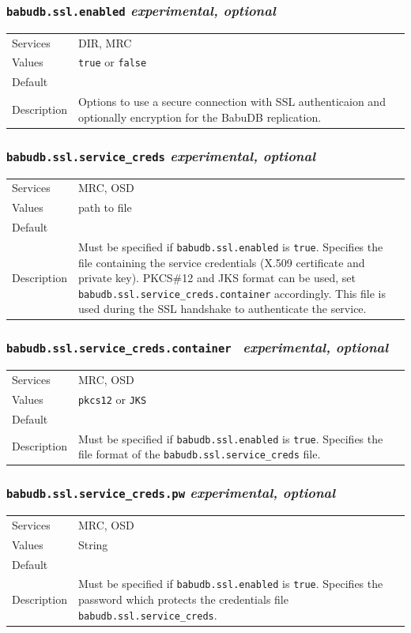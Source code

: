 \documentclass[a4paper,10pt]{book}
\begin{document}
\subsubsection{\texttt{babudb.ssl.enabled} \textit{experimental, optional}}
\begin{tabular}{lp{10cm}}
 Services & DIR, MRC\\
 Values   & \texttt{true} or \texttt{false}\\
 Default  & \\
 Description & Options to use a secure connection with SSL authenticaion and optionally encryption for the BabuDB replication. 
\end{tabular}

\subsubsection{\texttt{babudb.ssl.service\_creds} \textit{experimental, optional}}
\begin{tabular}{lp{10cm}}
 Services & MRC, OSD\\
 Values   & path to file\\
 Default  & \\
 Description & Must be specified if \texttt{babudb.ssl.enabled} is \texttt{true}. Specifies the file containing the service credentials (X.509 certificate and private key). PKCS\#12 and JKS format can be used, set \texttt{babudb.ssl.service\_creds.container} accordingly. This file is used during the SSL handshake to authenticate the service.
\end{tabular}

\subsubsection{\texttt{babudb.ssl.service\_creds.container } \textit{experimental, optional}}
\begin{tabular}{lp{10cm}}
 Services & MRC, OSD\\
 Values   & \texttt{pkcs12} or \texttt{JKS}\\
 Default  & \\
 Description & Must be specified if \texttt{babudb.ssl.enabled} is \texttt{true}. Specifies the file format of the \texttt{babudb.ssl.service\_creds} file.
\end{tabular}

\subsubsection{\texttt{babudb.ssl.service\_creds.pw} \textit{experimental, optional}}
\begin{tabular}{lp{10cm}}
 Services & MRC, OSD\\
 Values   & String\\
 Default  & \\
 Description & Must be specified if \texttt{babudb.ssl.enabled} is \texttt{true}. Specifies the password which protects the credentials file \texttt{babudb.ssl.service\_creds}.
\end{tabular}
\end{document}

